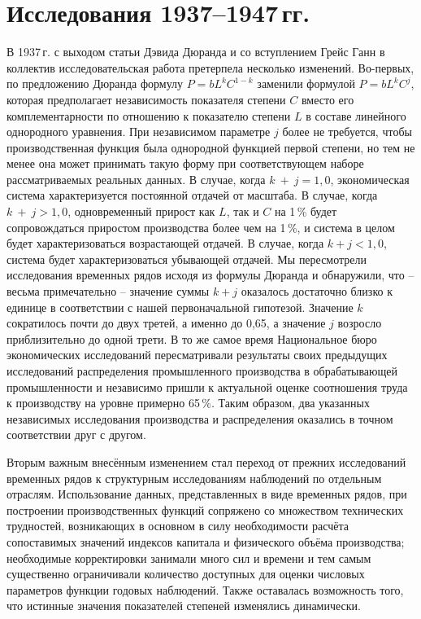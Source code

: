 \documentclass{article}
\begin{document}
\section*{Исследования 1937--1947\,гг.}

В 1937\,г. с выходом статьи Дэвида Дюранда \cite{Durand:1} и со вступлением Грейс Ганн в коллектив исследовательская работа претерпела несколько изменений. Во-первых, по предложению Дюранда формулу \(P=bL^kC^{1-k}\) заменили формулой \(P=bL^kC^j\), которая предполагает независимость показателя степени \(C\) вместо его комплементарности по отношению к показателю степени \(L\) в составе линейного однородного уравнения. При независимом параметре \(j\) более не требуется, чтобы производственная функция была однородной функцией первой степени, но тем не менее она может принимать такую форму при соответствующем наборе рассматриваемых реальных данных. В случае, когда \(k\:+\:j = 1{,}0\), экономическая система характеризуется постоянной отдачей от масштаба. В случае, когда \(k\:+\:j > 1{,}0\), одновременный прирост как \(L\), так и \(C\) на 1\,\% будет сопровождаться приростом производства более чем на 1\,\%, и система в %
целом будет характеризоваться возрастающей отдачей. В случае, когда \(k+j < 1{,}0\), система будет характеризоваться убывающей отдачей. Мы пересмотрели исследования временных рядов исходя из формулы Дюранда и обнаружили, что -- весьма примечательно -- значение суммы \(k + j\) оказалось достаточно близко к единице в соответствии с нашей первоначальной гипотезой. Значение \(k\) сократилось почти до двух третей, а именно до 0,65, а значение \(j\) возросло приблизительно до одной трети. В то же самое время Национальное бюро экономических исследований пересматривали результаты своих предыдущих исследований распределения промышленного производства в обрабатывающей промышленности и независимо пришли к актуальной оценке соотношения труда к производству на уровне примерно 65\,\%. Таким образом, два указанных независимых исследования производства и распределения оказались в точном соответствии друг с другом.

Вторым важным внесённым изменением стал переход от прежних исследований временных рядов к структурным исследованиям наблюдений по отдельным отраслям. Использование данных, представленных в виде временных рядов, при построении производственных функций сопряжено со множеством технических трудностей, возникающих в основном в силу необходимости расчёта сопоставимых значений индексов капитала и физического объёма производства; необходимые корректировки занимали много сил и времени и тем самым существенно ограничивали количество доступных для оценки числовых параметров функции годовых наблюдений. Также оставалась возможность того, что истинные значения показателей степеней изменялись динамически.
\end{document}

